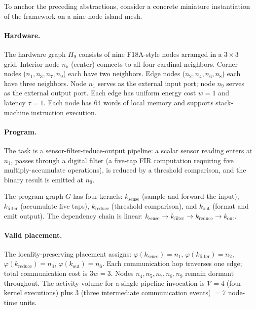 \documentclass[11pt, a4paper]{article}
\begin{document}
To anchor the preceding abstractions, consider a concrete miniature instantiation
of the framework on a nine-node island mesh.

\paragraph{Hardware.} The hardware graph $H_9$ consists of nine F18A-style nodes
arranged in a $3 \times 3$ grid. Interior node $n_5$ (center) connects to all four
cardinal neighbors. Corner nodes ($n_1, n_3, n_7, n_9$) each have two neighbors.
Edge nodes ($n_2, n_4, n_6, n_8$) each have three neighbors. Node $n_1$ serves as
the external input port; node $n_9$ serves as the external output port.
Each edge has uniform energy cost $w = 1$ and latency $\tau = 1$. Each node has
64 words of local memory and supports stack-machine instruction execution.

\paragraph{Program.} The task is a sensor-filter-reduce-output pipeline:
a scalar sensor reading enters at $n_1$, passes through a digital filter (a
five-tap FIR computation requiring five multiply-accumulate operations), is reduced
by a threshold comparison, and the binary result is emitted at $n_9$.

The program graph $G$ has four kernels: $k_{\text{sense}}$ (sample and forward
the input), $k_{\text{filter}}$ (accumulate five taps), $k_{\text{reduce}}$
(threshold comparison), and $k_{\text{out}}$ (format and emit output). The
dependency chain is linear: $k_{\text{sense}} \to k_{\text{filter}} \to
k_{\text{reduce}} \to k_{\text{out}}$.

\paragraph{Valid placement.} The locality-preserving placement assigns:
$\varphi(k_{\text{sense}}) = n_1$, $\varphi(k_{\text{filter}}) = n_2$,
$\varphi(k_{\text{reduce}}) = n_3$, $\varphi(k_{\text{out}}) = n_6$.
Each communication hop traverses one edge; total communication cost is $3w = 3$.
Nodes $n_4, n_5, n_7, n_8, n_9$ remain dormant throughout. The activity volume
for a single pipeline invocation is $\mathcal{V} = 4$ (four kernel executions) plus
$3$ (three intermediate communication events) $= 7$ node-time units.
\end{document}
